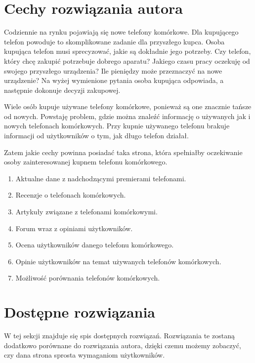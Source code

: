 \section{Cechy rozwiązania autora}
\label{ideal_solution}
Codziennie na rynku pojawiają się nowe telefony komórkowe. Dla kupującego telefon powoduje to skomplikowane zadanie dla przyszłego kupca. Osoba kupująca telefon musi sprecyzować, jakie są dokładnie jego potrzeby. Czy telefon, który chcę zakupić potrzebuje dobrego aparatu? Jakiego czasu pracy oczekuję od swojego przyszłego urządzenia? Ile pieniędzy może przeznaczyć na nowe urządzenie? Na wyżej wymienione pytania osoba kupująca odpowiada, a następnie dokonuje decyzji zakupowej.

Wiele osób kupuje używane telefony komórkowe, ponieważ są one znacznie tańsze od nowych. Powstaję problem, gdzie można znaleźć informację o używanych jak i nowych telefonach komórkowych. Przy kupnie używanego telefonu brakuje informacji od użytkowników o tym, jak długo telefon działał.  

Zatem jakie cechy powinna posiadać taka strona, która spełniałby oczekiwanie osoby zainteresowanej kupnem telefonu komórkowego.
\begin{enumerate}
    \item Aktualne dane z nadchodzącymi premierami telefonami.
    \item Recenzje o telefonach komórkowych.
    \item Artykuły związane z telefonami komórkowymi.
    \item Forum wraz z opiniami użytkowników.
    \item Ocena użytkowników danego telefonu komórkowego.
    \item Opinie użytkowników na temat używanych telefonów komórkowych.
    \item Możliwość porównania telefonów komórkowych.
\end{enumerate}

\section{Dostępne rozwiązania}
W tej sekcji znajduje się spis dostępnych rozwiązań. Rozwiązania te zostaną dodatkowo porównane do rozwiązania autora, dzięki czemu możemy zobaczyć, czy dana strona sprosta wymaganiom użytkowników.

